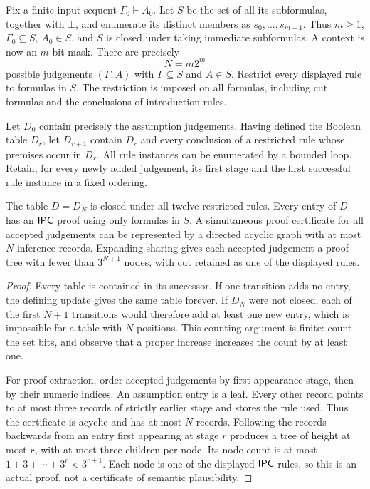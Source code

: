 Fix a finite input sequent $\Gamma_0\vdash A_0$. Let $S$ be the set of all
its subformulas, together with $\bot$, and enumerate its distinct members
as $s_0,\ldots,s_{m-1}$. Thus $m\geq1$, $\Gamma_0\subseteq S$, $A_0\in S$,
and $S$ is closed under taking immediate subformulas. A context is now an
$m$-bit mask. There are precisely
\[
                 N=m2^m
\]
possible judgements $(\Gamma,A)$ with $\Gamma\subseteq S$ and $A\in S$.
Restrict every displayed rule to formulas in $S$. The restriction is imposed
on all formulas, including cut formulas and the conclusions of introduction
rules.

Let $D_0$ contain precisely the assumption judgements. Having defined the
Boolean table $D_r$, let $D_{r+1}$ contain $D_r$ and every conclusion of a
restricted rule whose premises occur in $D_r$. All rule instances can be
enumerated by a bounded loop. Retain, for every newly added judgement, its
first stage and the first successful rule instance in a fixed ordering.

\begin{lemma}
\label{lem:ipc-finite-closure}
The table $D=D_N$ is closed under all twelve restricted rules. Every entry
of $D$ has an $\mathsf{IPC}$ proof using only formulas in $S$. A simultaneous proof
certificate for all accepted judgements can be represented by a directed
acyclic graph with at most $N$ inference records. Expanding sharing gives
each accepted judgement a proof tree with fewer than $3^{N+1}$ nodes, with
cut retained as one of the displayed rules.
\end{lemma}
\begin{proof}
Every table is contained in its successor. If one transition adds no entry,
the defining update gives the same table forever. If $D_N$ were not closed,
each of the first $N+1$ transitions would therefore add at least one new
entry, which is impossible for a table with $N$ positions. This counting
argument is finite: count the set bits, and observe that a proper increase
increases the count by at least one.

For proof extraction, order accepted judgements by first appearance stage,
then by their numeric indices. An assumption entry is a leaf. Every other
record points to at most three records of strictly earlier stage and stores
the rule used. Thus the certificate is acyclic and has at most $N$ records.
Following the records backwards from an entry first appearing at stage $r$
produces a tree of height at most $r$, with at most three children per node.
Its node count is at most $1+3+\cdots+3^r<3^{r+1}$. Each node is one of the
displayed $\mathsf{IPC}$ rules, so this is an actual proof, not a certificate of
semantic plausibility.
\end{proof}

